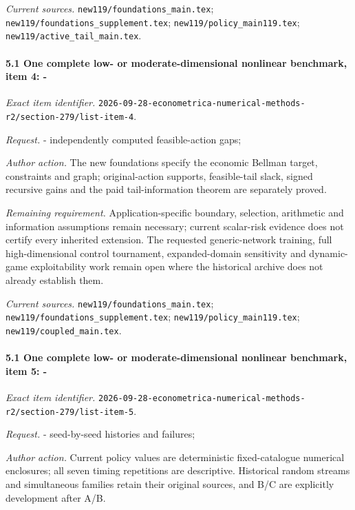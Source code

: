 \par\emph{Current sources.} \nolinkurl{new119/foundations_main.tex}; \nolinkurl{new119/foundations_supplement.tex}; \nolinkurl{new119/policy_main119.tex}; \nolinkurl{new119/active_tail_main.tex}.

\paragraph{5.1 One complete low- or moderate-dimensional nonlinear benchmark, item 4: -}

\emph{Exact item identifier.} \nolinkurl{2026-09-28-econometrica-numerical-methods-r2/section-279/list-item-4}.

\par\emph{Request.} - independently computed feasible-action gaps;

\par\emph{Author action.} The new foundations specify the economic Bellman target, constraints and graph; original-action supports, feasible-tail slack, signed recursive gains and the paid tail-information theorem are separately proved.

\par\emph{Remaining requirement.} Application-specific boundary, selection, arithmetic and information assumptions remain necessary; current scalar-risk evidence does not certify every inherited extension. The requested generic-network training, full high-dimensional control tournament, expanded-domain sensitivity and dynamic-game exploitability work remain open where the historical archive does not already establish them.

\par\emph{Current sources.} \nolinkurl{new119/foundations_main.tex}; \nolinkurl{new119/foundations_supplement.tex}; \nolinkurl{new119/policy_main119.tex}; \nolinkurl{new119/coupled_main.tex}.

\paragraph{5.1 One complete low- or moderate-dimensional nonlinear benchmark, item 5: -}

\emph{Exact item identifier.} \nolinkurl{2026-09-28-econometrica-numerical-methods-r2/section-279/list-item-5}.

\par\emph{Request.} - seed-by-seed histories and failures;

\par\emph{Author action.} Current policy values are deterministic fixed-catalogue numerical enclosures; all seven timing repetitions are descriptive. Historical random streams and simultaneous families retain their original sources, and B/\allowbreak{}C are explicitly development after A/\allowbreak{}B.

